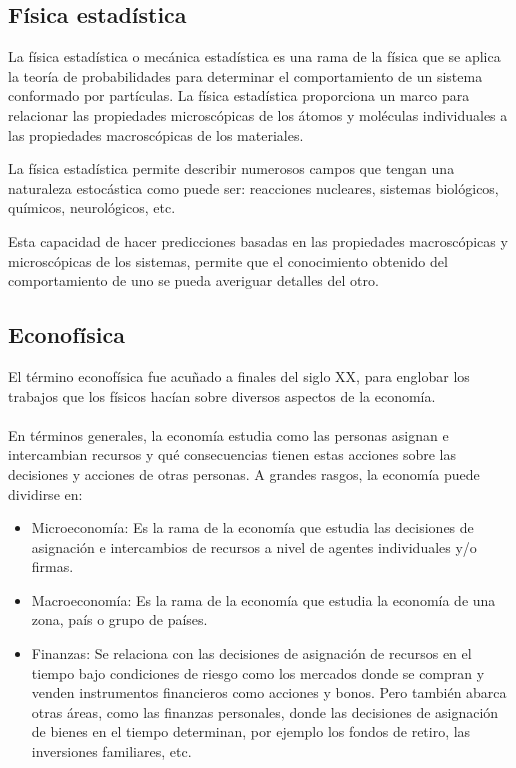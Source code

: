 \subsection*{Física estadística}
La física estadística o mecánica estadística es una rama de la física que se aplica la teoría de probabilidades para determinar el comportamiento de un sistema conformado por partículas. La física estadística proporciona un marco para relacionar las propiedades microscópicas de los átomos y moléculas individuales a las propiedades macroscópicas de los materiales. \cite{Rodriguez2021}

La física estadística permite describir numerosos campos que tengan una naturaleza estocástica como puede ser: reacciones nucleares, sistemas biológicos, químicos, neurológicos, etc.

Esta capacidad de hacer predicciones basadas en las propiedades macroscópicas y microscópicas de los sistemas, permite que el conocimiento obtenido del comportamiento de uno se pueda averiguar detalles del otro.

\subsection*{Econofísica}
El término econofísica fue acuñado a finales del siglo XX, para englobar los trabajos que los físicos hacían sobre diversos aspectos de la economía.
\\
\\
En términos generales, la economía estudia como las personas asignan e intercambian recursos y qué consecuencias tienen estas acciones sobre las decisiones y acciones de otras personas. A grandes rasgos, la economía puede dividirse en:

\begin{itemize}
    \item Microeconomía: Es la rama de la economía que estudia las decisiones de asignación e intercambios de recursos a nivel de agentes individuales y/o firmas.
    \item Macroeconomía: Es la rama de la economía que estudia la economía de una zona, país o grupo de países.
    \item Finanzas: Se relaciona con las decisiones de asignación de recursos en el tiempo bajo condiciones de riesgo como los mercados donde se compran y venden instrumentos financieros como acciones y bonos. Pero también abarca otras áreas, como las finanzas personales, donde las decisiones de asignación de bienes en el tiempo determinan, por ejemplo los fondos de retiro, las inversiones familiares, etc.
\end{itemize}

